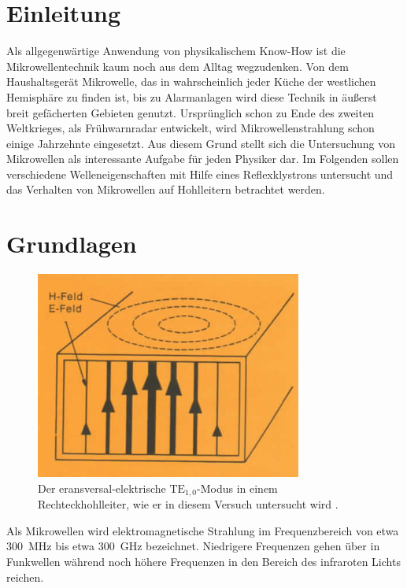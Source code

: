 \section{Einleitung}
\label{sec:einleitung}
Als allgegenwärtige Anwendung von physikalischem Know-How ist die
Mikrowellentechnik kaum noch aus dem Alltag wegzudenken.
Von dem Haushaltsgerät Mikrowelle, das in wahrscheinlich jeder Küche der
westlichen Hemisphäre zu finden ist, bis zu Alarmanlagen wird diese Technik
in äußerst breit gefächerten Gebieten genutzt.
Ursprünglich schon zu Ende des zweiten Weltkrieges, als Frühwarnradar
entwickelt, wird Mikrowellenstrahlung schon einige Jahrzehnte eingesetzt.
Aus diesem Grund stellt sich die Untersuchung von Mikrowellen als interessante
Aufgabe für jeden Physiker dar.
Im Folgenden sollen verschiedene Welleneigenschaften mit Hilfe eines
Reflexklystrons untersucht und das Verhalten von Mikrowellen auf Hohlleitern
betrachtet werden.

\section{Grundlagen}
\label{sec:grundlagen}
\begin{figure}
    \centering
    \includegraphics[width=0.9\linewidth]{img/hohlleiter.png}
    \caption{
        Der eransversal-elektrische $\text{TE}_{1,0}$-Modus in einem
        Rechteckhohlleiter, wie er in diesem Versuch untersucht wird
        \cite{V53}.
    }
    \label{fig:leiter}
\end{figure}
Als Mikrowellen wird elektromagnetische Strahlung im Frequenzbereich
von etwa \SI{300}{\mega \hertz} bis etwa \SI{300}{\giga \hertz} bezeichnet.
Niedrigere Frequenzen gehen über in Funkwellen während noch höhere Frequenzen
in den Bereich des infraroten Lichts reichen.

